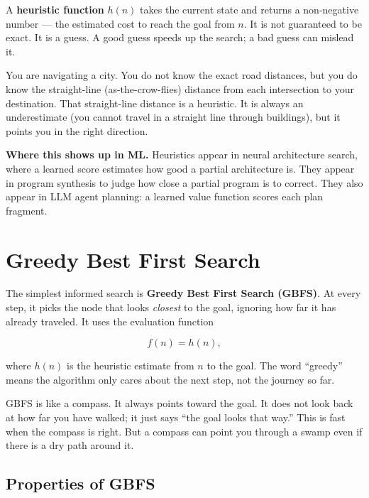\documentclass[a4paper,11pt]{article}
\newcommand{\vocab}[1]{\textbf{\color{navy}#1}}
\begin{document}
\medskip

A \vocab{heuristic function} $h(n)$ takes the current state and returns a
non-negative number --- the estimated cost to reach the goal from $n$. It is
not guaranteed to be exact. It is a guess. A good guess speeds up the search;
a bad guess can mislead it.

\begin{everyday}
You are navigating a city. You do not know the exact road distances, but you
do know the straight-line (as-the-crow-flies) distance from each intersection
to your destination. That straight-line distance is a heuristic. It is always
an underestimate (you cannot travel in a straight line through buildings), but
it points you in the right direction.
\end{everyday}

\noindent\textbf{Where this shows up in ML.}
Heuristics appear in neural architecture search, where a learned score
estimates how good a partial architecture is. They appear in program
synthesis to judge how close a partial program is to correct. They also
appear in LLM agent planning: a learned value function scores each plan
fragment.

\section{Greedy Best First Search}

The simplest informed search is \vocab{Greedy Best First Search (GBFS)}. At
every step, it picks the node that looks \emph{closest} to the goal, ignoring
how far it has already traveled. It uses the evaluation function

\[
  f(n) = h(n),
\]

where $h(n)$ is the heuristic estimate from $n$ to the goal. The word
``greedy'' means the algorithm only cares about the next step, not the
journey so far.

\begin{intuition}
GBFS is like a compass. It always points toward the goal. It does not look
back at how far you have walked; it just says ``the goal looks that way.''
This is fast when the compass is right. But a compass can point you through
a swamp even if there is a dry path around it.
\end{intuition}

\subsection*{Properties of GBFS}
\end{document}
